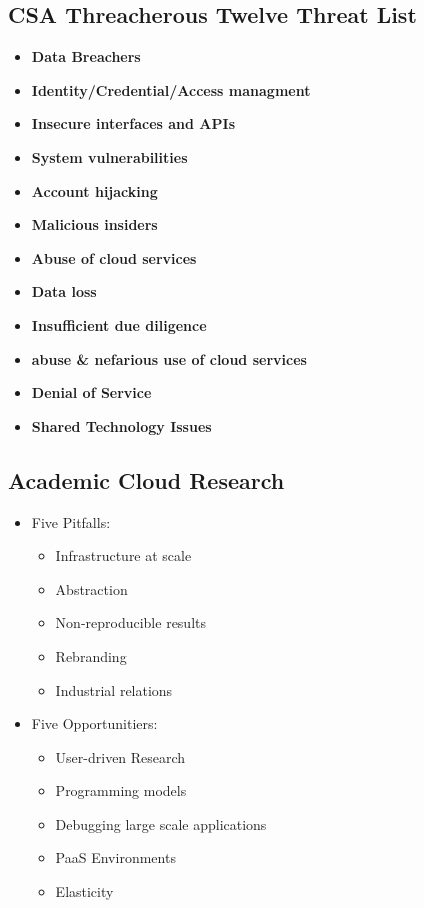 \documentclass[a4paper]{article}
\begin{document}
\begin{multicols}{3}
\subsection{CSA Threacherous Twelve Threat List}
\begin{itemize}
    \item \textbf{Data Breachers}
    \item \textbf{Identity/Credential/Access managment}
    \item \textbf{Insecure interfaces and APIs}
    \item \textbf{System vulnerabilities}
    \item \textbf{Account hijacking}
    \item \textbf{Malicious insiders}
    \item \textbf{Abuse of cloud services}
    \item \textbf{Data loss}
    \item \textbf{Insufficient due diligence}
    \item \textbf{abuse \& nefarious use of cloud services}
    \item \textbf{Denial of Service}
    \item \textbf{Shared Technology Issues}
\end{itemize}

\subsection{Academic Cloud Research}
\begin{itemize}
    \item Five Pitfalls:
        \begin{itemize}
            \item Infrastructure at scale
            \item Abstraction
            \item Non-reproducible results
            \item Rebranding
            \item Industrial relations
        \end{itemize}
    \item Five Opportunitiers:
        \begin{itemize}
            \item User-driven Research
            \item Programming models
            \item Debugging large scale applications
            \item PaaS Environments
            \item Elasticity
        \end{itemize}
\end{itemize}


\end{multicols}
\end{document}
